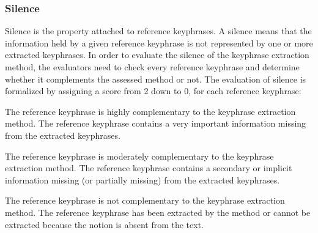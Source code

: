         \subsubsection{Silence}
        \label{subsubsec:silence}
            Silence is the property attached to reference keyphrases.
            A silence means that the information held by a given reference keyphrase is not represented by one or more extracted keyphrases.
            In order to evaluate the silence of the keyphrase extraction method, the evaluators need to check every reference keyphrase and determine whether it complements the assessed method or not.
            The evaluation of silence is formalized by assigning a score from 2 down to 0, for each reference keyphrase:
                \begin{etaremune}[start=2]
                    \item{
                        The reference keyphrase is highly complementary to the keyphrase extraction method.
                        The reference keyphrase contains a very important information missing from the extracted keyphrases.
                    }
                    \item{
                        The reference keyphrase is moderately complementary to the keyphrase extraction method.
                        The reference keyphrase contains a secondary or implicit information missing (or partially missing) from the extracted keyphrases.
                    }
                    \item{
                        The reference keyphrase is not complementary to the keyphrase extraction method.
                        The reference keyphrase has been extracted by the method or cannot be extracted because the notion is absent from the text.
                    }
                \end{etaremune}


